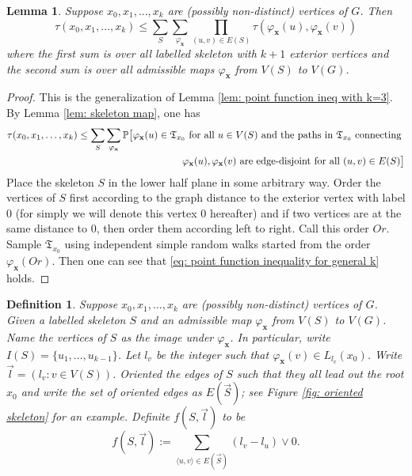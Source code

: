 \documentclass[12pt]{article}
\newtheorem{lemma}[theorem]{Lemma}
\newtheorem{definition}[theorem]{Definition}
\numberwithin{equation}{section}
\newcommand{\be}{\begin{equation}}
\newcommand{\ee}{\end{equation}}
\newcommand{\1}{\mathbf{1}}
\begin{document}
\begin{lemma}\label{lem: point function inequality for general k}
	Suppose $x_0,x_1,\ldots,x_k$ are (possibly non-distinct) vertices of $G$. Then 
	\be\label{eq:  point function inequality for general k}
	\tau(x_0,x_1,\ldots,x_k)\leq \sum_S\sum_{\varphi_{\mathbf{x}}}\prod_{(u,v)\in E(S)}\tau(\varphi_{\mathbf{x}}(u),\varphi_{\mathbf{x}}(v))
	\ee 
	where the first sum is over all labelled skeleton with $k+1$ exterior vertices and the second sum is over all admissible maps $\varphi_{\mathbf{x}}$ from $V(S)$ to $V(G)$.
\end{lemma}
\begin{proof}
	This is the generalization of Lemma \ref{lem: point function ineq with k=3}.
	By Lemma \ref{lem: skeleton map}, one has 
	\begin{align*}
	\tau(x_0,x_1,\ldots,x_k)\leq \sum_S\sum_{\varphi_{\mathbf{x}}}\mathbb{P}\big[
	\varphi_{\mathbf{x}}(u)\in \mathfrak{T}_{x_0} \textnormal{ for all }u\in V(S)\textnormal{ and the paths in } \mathfrak{T}_{x_0} \textnormal{ connecting } \\
	\varphi_{\mathbf{x}}(u),\varphi_{\mathbf{x}}(v)  \textnormal{ are edge-disjoint for all }(u,v)\in E(S)
	\big]
	\end{align*}
	Place the skeleton $S$ in the lower half plane in some arbitrary way. Order the vertices of $S$ first according to the graph distance to the exterior vertex with label $0$ (for simply we will denote this vertex $0$ hereafter) and if two vertices are at the same distance to $0$, then order them according left to right. Call this order $Or$.
	Sample  $\mathfrak{T}_{x_0}$ using independent simple random walks started from the order $\varphi_{\mathbf{x}}(Or)$. Then one can see that \eqref{eq:  point function inequality for general k} holds. 
\end{proof}

\begin{definition}\label{def: oriented skeleton sum}
	Suppose $x_0,x_1,\ldots,x_k$ are (possibly non-distinct) vertices of $G$.
	Given a labelled skeleton $S$ and an admissible map  $\varphi_{\mathbf{x}}$ from $V(S)$ to $V(G)$. Name the  vertices of $S$ as the image under $\varphi_{\mathbf{x}}$. In particular, write $I(S)=\{u_1,\ldots,u_{k-1}\}$. Let $l_v$ be the integer such that $\varphi_{\mathbf{x}}(v)\in L_{l_v}(x_0)$. Write $\vec{l}=(l_v\colon v\in V(S))$. Oriented the edges of $S$ such that they all lead out the root $x_0$ and write the set of oriented edges as $E(\vec{S})$; see Figure \ref{fig: oriented skeleton} for an example. Definite $f(S,\vec{l})$ to be
	\[
	f(S,\vec{l}):=\sum_{\langle u,v\rangle\in E(\vec{S})}{(l_v-l_u)\vee0}.
	\]
\end{definition}
\end{document}
